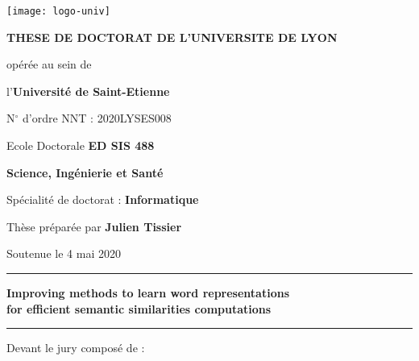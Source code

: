 \begin{titlepage}
\begin{center}
  \texttt{[image: logo-univ]}

  \vspace{3em}
  {\Large \textbf{THESE DE DOCTORAT DE L’UNIVERSITE DE LYON}}

  \vspace{0.6em}
  opérée au sein de\par
  l'\textbf{Université de Saint-Etienne}\par
  \vspace{0.1em}
  {\small N$^\circ$ d’ordre NNT : 2020LYSES008}

  \vspace{1.6em}
  Ecole Doctorale \textbf{ED SIS 488} \par
  \textbf{Science, Ingénierie et Santé}

  \vspace{1.6em}
  Spécialité de doctorat : \textbf{Informatique}

  \vspace{1.6em}
  {\large Thèse préparée par \textbf{Julien Tissier} \par}
  \vspace{0.1em}
  {\large Soutenue le 4 mai 2020}

  \vspace{1em}

  \rule{\textwidth}{1pt}

  \vspace{0.8em}
  {\Large \textbf{Improving methods to learn word representations\\}}
  \vspace{0.6em}
  {\Large \textbf{for efficient semantic similarities computations}}
  \vspace{0.8em}

  \rule{\textwidth}{1pt}

  \vspace{2em}
  Devant le jury composé de :

  \begin{table}[h]
\end{table}
\end{center}
\end{titlepage}
